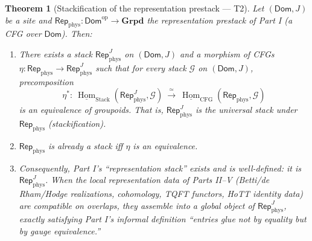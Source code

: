\documentclass[12pt]{article}
\newtheorem{theorem}{Theorem}[section]
\theoremstyle{definition}
\theoremstyle{remark}
\newcommand{\cat}[1]{\mathcal{#1}}
\newcommand{\Dom}{\mathsf{Dom}}
\newcommand{\Grpd}{\mathbf{Grpd}}
\newcommand{\Repp}{\mathsf{Rep}_{\mathrm{phys}}}
\newcommand{\iHom}{\underline{\operatorname{Hom}}}
\newcommand{\op}{\mathrm{op}}
\begin{document}
\begin{theorem}[Stackification of the representation prestack --- T2]
\label{thm:stackification}
Let $(\Dom, J)$ be a site and $\Repp:\Dom^{\op}\to\Grpd$ the representation prestack of
Part I (a CFG over $\Dom$). Then:
\begin{enumerate}
\item There exists a stack $\Repp^{J}$ on $(\Dom, J)$ and a morphism of CFGs
$\eta:\Repp\to\Repp^{J}$ such that for every stack $\cat G$ on $(\Dom,J)$, precomposition
\[
\eta^*:\ \iHom_{\mathrm{Stack}}(\Repp^{J},\cat G)\ \xrightarrow{\ \simeq\ }\
\iHom_{\mathrm{CFG}}(\Repp,\cat G)
\]
is an equivalence of groupoids. That is, $\Repp^{J}$ is the universal stack under
$\Repp$ (\emph{stackification}).
\item $\Repp$ is already a stack iff $\eta$ is an equivalence.
\item Consequently, Part I's ``representation stack'' exists and is well-defined: it is
$\Repp^{J}$. When the local representation data of Parts II--V (Betti/de Rham/Hodge
realizations, cohomology, TQFT functors, HoTT identity data) are compatible on
overlaps, they assemble into a global object of $\Repp^{J}$, exactly satisfying Part I's
informal definition ``entries glue not by equality but by gauge equivalence.''
\end{enumerate}
\end{theorem}
\end{document}
